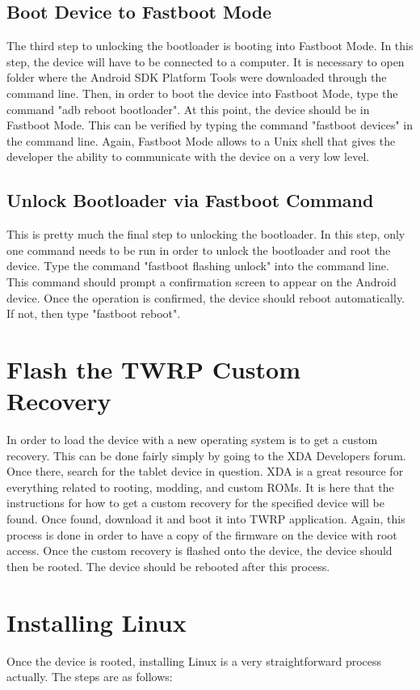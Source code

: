 \subsection{Boot Device to Fastboot Mode}
The third step to unlocking the bootloader is booting into Fastboot Mode. In this step, the device will have to be connected to a computer. It is necessary to 
open folder where the Android SDK Platform Tools were downloaded through the command line. Then, in order to boot the device into Fastboot Mode, type the command
"adb reboot bootloader". At this point, the device should be in Fastboot Mode. This can be verified by typing the command "fastboot devices" in the command line.
Again, Fastboot Mode allows to a Unix shell that gives the developer the ability to communicate with the device on a very low level.

\subsection{Unlock Bootloader via Fastboot Command}
This is pretty much the final step to unlocking the bootloader. In this step, only one command needs to be run in order to unlock the bootloader and root the device. 
Type the command "fastboot flashing unlock" into the command line. This command should prompt a confirmation screen to appear on the Android device. 
Once the operation is confirmed, the device should reboot automatically. If not, then type "fastboot reboot".

\section{Flash the TWRP Custom Recovery}
In order to load the device with a new operating system is to get a custom recovery. This can be done fairly simply by going to the XDA Developers forum. 
Once there, search for the tablet device in question. XDA is a great resource for everything related to rooting, modding, and custom ROMs. It is here that 
the instructions for how to get a custom recovery for the specified device will be found. Once found, download it and boot it into TWRP application. Again, 
this process is done in order to have a copy of the firmware on the device with root access. Once the custom recovery is flashed onto the device, the device should 
then be rooted. The device should be rebooted after this process.


\section{Installing Linux}
Once the device is rooted, installing Linux is a very straightforward process actually. The steps are as follows:

